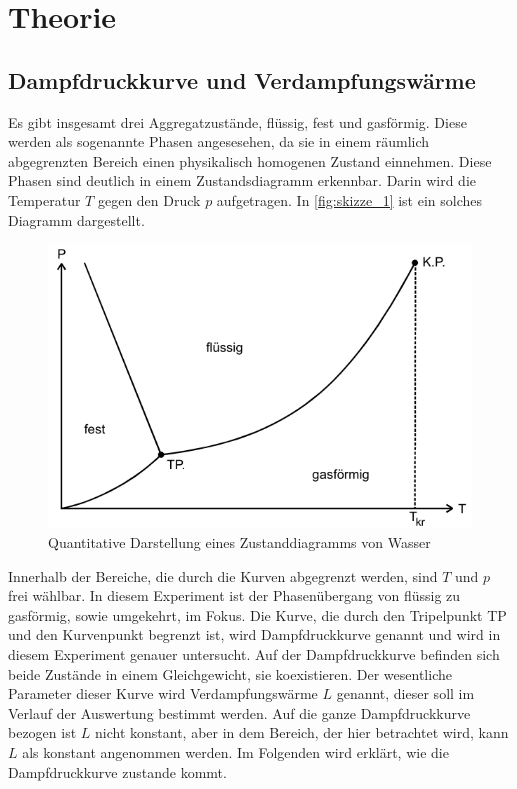 \section{Theorie}
\label{sec:Theorie}



\subsection{Dampfdruckkurve und Verdampfungswärme}
\label{ssec:a}
Es gibt insgesamt drei Aggregatzustände, flüssig, fest und gasförmig.
Diese werden als sogenannte Phasen angesesehen, da sie in einem räumlich abgegrenzten Bereich einen physikalisch homogenen Zustand einnehmen.
Diese Phasen sind deutlich in einem Zustandsdiagramm erkennbar.
Darin wird die Temperatur $T$ gegen den Druck $p$ aufgetragen.
In \autoref{fig:skizze_1} ist ein solches Diagramm dargestellt.

\begin{figure}
    \centering
    \includegraphics[width=\textwidth/2]{images/bild1.png}
    \caption{Quantitative Darstellung eines Zustanddiagramms von Wasser \cite{V203}}
    \label{fig:skizze_1}
\end{figure}

Innerhalb der Bereiche, die durch die Kurven abgegrenzt werden, sind $T$ und $p$ frei wählbar.
In diesem Experiment ist der Phasenübergang von flüssig zu gasförmig, sowie umgekehrt, im Fokus.
Die Kurve, die durch den Tripelpunkt TP und den Kurvenpunkt begrenzt ist, wird Dampfdruckkurve genannt und wird in diesem Experiment genauer untersucht.
Auf der Dampfdruckkurve befinden sich beide Zustände in einem Gleichgewicht, sie koexistieren.
Der wesentliche Parameter dieser Kurve wird Verdampfungswärme $L$ genannt, dieser soll im Verlauf der Auswertung bestimmt werden.
Auf die ganze Dampfdruckkurve bezogen ist $L$ nicht konstant, aber in dem Bereich, der hier betrachtet wird, kann $L$ als konstant angenommen werden.
Im Folgenden wird erklärt, wie die Dampfdruckkurve zustande kommt.

